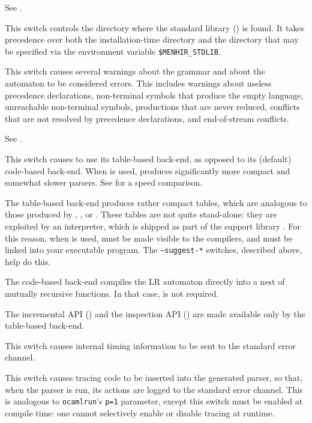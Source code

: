 \documentclass[onecolumn,11pt,nocopyrightspace,preprint]{sigplanconf}
\begin{document}
\docswitch{\orawdepend} See .

 This switch controls the directory where
the standard library () is found. It takes precedence over
both the installation-time directory and the directory that may be specified
via the environment variable \verb+$MENHIR_STDLIB+.

\docswitch{\ostrict} This switch causes several warnings about the grammar
and about the automaton to be considered errors. This includes warnings about
useless precedence declarations, non-terminal symbols that produce the empty
language, unreachable non-terminal symbols, productions that are never
reduced, conflicts that are not resolved by precedence declarations, and
end-of-stream conflicts.

 See .

\docswitch{\otable} This switch causes \menhir to use its table-based
back-end, as opposed to its (default) code-based back-end. When \otable is
used, \menhir produces significantly more compact and somewhat slower parsers.
See  for a speed comparison.

The table-based back-end produces rather compact tables, which are analogous
to those produced by \yacc, \bison, or \ocamlyacc. These tables are not quite
stand-alone: they are exploited by an interpreter, which is shipped as part of
the support library \menhirlib. For this reason, when \otable is used,
\menhirlib must be made visible to the \ocaml compilers, and must be linked
into your executable program. The \texttt{--suggest-*} switches, described
above, help do this.

The code-based back-end compiles the LR automaton directly into a nest of
mutually recursive \ocaml functions. In that case, \menhirlib is not required.

The incremental API () and the inspection API
() are made available only by the table-based back-end.

\docswitch{\otimings} This switch causes internal timing information to
be sent to the standard error channel.

\docswitch{\otrace} This switch causes tracing code to be inserted into
the generated parser, so that, when the parser is run, its actions are
logged to the standard error channel. This is analogous to \texttt{ocamlrun}'s
\texttt{p=1} parameter, except this switch must be enabled at compile time:
one cannot selectively enable or disable tracing at runtime.
\end{document}
